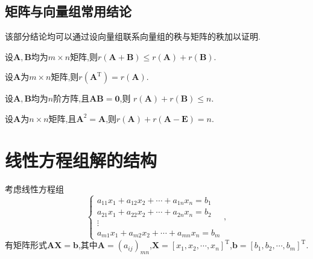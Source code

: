\documentclass[9pt,a4paper]{book}
\begin{document}
\subsection{矩阵与向量组常用结论}
该部分结论均可以通过设向量组联系向量组的秩与矩阵的秩加以证明.
\begin{feature}
	设$ \bm{A},\bm{B} $均为$ m\times n $矩阵,则$ r(\bm{A}+\bm{B})\leqslant r(\bm{A})+r(\bm{B}) $.
\end{feature}
\begin{feature}
	设$ \bm{A} $为$ m\times n $矩阵,则$ r(\bm{A}^{\mathrm{T}})=r(\bm{A}) $.
\end{feature}
\begin{feature}
	设$ \bm{A},\bm{B} $均为$  n $阶方阵,且$ \bm{AB}=\bm{0} $,则 $ r(\bm{A})+r(\bm{B})\leqslant n $.
\end{feature}
\begin{feature}
	设$ \bm{A} $为$ n\times n $矩阵,且$ \bm{A}^2=\bm{A} $,则$ r(\bm{A})+r(\bm{A}-\bm{E})=n $.
\end{feature}
\section{线性方程组解的结构}
考虑线性方程组	\begin{equation}\label{klvxxfcz}
\left\{
\begin{array}{c}
a_{11}x_1+a_{12}x_2+\cdots+a_{1n}x_n=b_1\\
a_{21}x_1+a_{22}x_2+\cdots+a_{2n}x_n=b_2\\
\vdots \\
a_{m1}x_1+a_{m2}x_2+\cdots+a_{mn}x_n=b_m
\end{array}
\right.,
\end{equation}有矩阵形式$ \bm{AX}=\bm{b} $,其中$ \bm{A}=(a_{ij})_{mn} $,$ \bm{X}=[x_1,x_2,\cdots,x_n]^{\mathrm{T}} $,$ \bm{b}=[b_1,b_2,\cdots,b_m]^{\mathrm{T}}. $\\
\end{document}
